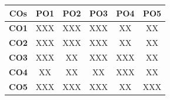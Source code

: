 \vspace{0.4em}
\begin{center}
\footnotesize
\begin{tabular}{|c|c|c|c|c|c|}
\hline
\textbf{COs} & \textbf{PO1} & \textbf{PO2} & \textbf{PO3} & \textbf{PO4} & \textbf{PO5} \\
\hline
\textbf{CO1} & XXX & XXX & XXX & XX & XX \\
\hline
\textbf{CO2} & XXX & XXX & XXX & XX & XX \\
\hline
\textbf{CO3} & XXX & XX & XXX & XXX & XX \\
\hline
\textbf{CO4} & XX & XX & XX & XXX & XX \\
\hline
\textbf{CO5} & XXX & XXX & XXX & XX & XXX \\
\hline
\end{tabular}
\end{center}
\normalsize

\newpage
